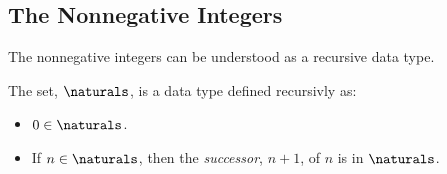 \subsection{The Nonnegative Integers}

The nonnegative integers can be understood as a recursive data type.
\begin{definition}\label{0succ}
The set, $\naturals$, is a data type defined recursivly as:
\begin{itemize}
\item $0 \in \naturals$.
\item If $n \in \naturals$, then the \emph{successor}, $n+1$, of $n$ is in
$\naturals$.
\end{itemize}

\end{definition}

\iffalse

